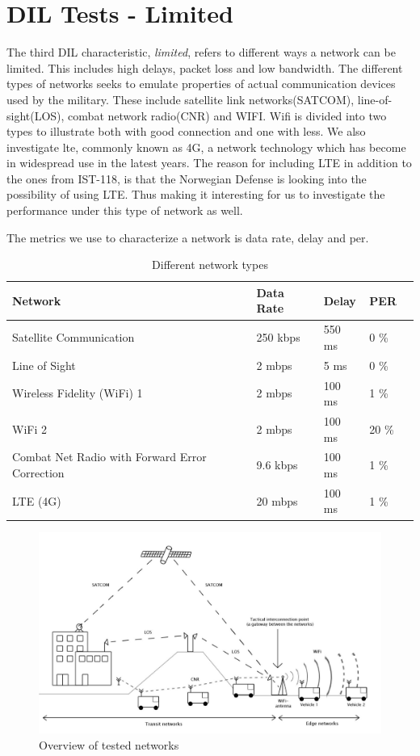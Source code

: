 \section{DIL Tests - Limited}

The third DIL characteristic, \textit{limited}, refers to different ways a network
can be limited. This includes high delays, packet loss and low bandwidth. The
different types of networks seeks to emulate properties of actual communication
devices used by the military. These include satellite link networks(SATCOM),
line-of-sight(LOS), combat network radio(CNR) and WIFI. Wifi is divided into two
types to illustrate both with good connection and one with less. We also
investigate \gls{lte}, commonly known as 4G, a network technology which has
become in widespread use in the latest years. The reason for including LTE in
addition to the ones from IST-118, is that the Norwegian Defense is looking into
the possibility of using LTE. Thus making it interesting for us to investigate
the performance under this type of network as well.

The metrics we use to characterize a network is data rate, delay and \gls{per}.

\begin{table}[h]
\begin{tabular}{| l | l | l | l | l |}
\hline
  \textbf{Network} & \textbf{Data Rate} & \textbf{Delay} & \textbf{PER} \\ \hline
  Satellite Communication & 250 kbps & 550 ms & 0 \% \\ \hline
  Line of Sight & 2 mbps & 5 ms & 0 \% \\ \hline
  Wireless Fidelity (WiFi) 1 & 2 mbps & 100 ms & 1 \% \\ \hline
  WiFi 2 & 2 mbps & 100 ms & 20 \% \\ \hline
  Combat Net Radio with Forward Error Correction & 9.6 kbps & 100 ms & 1 \% \\ \hline
  LTE (4G) & 20 mbps & 100 ms & 1 \% \\ \hline
\end{tabular}
\caption{Different network types}
\label{table-network-types}
\end{table}

\begin{figure}[h]
\includegraphics[scale=0.25]{images/networks_overview.pdf}
\caption{Overview of tested networks}
\label{figure-networks-overview}
\end{figure}

